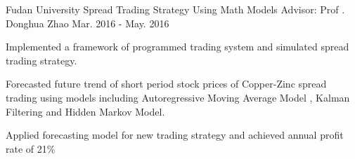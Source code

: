 \begin{cventries}
      
 \cventry
 {Fudan University} %
    {Spread Trading Strategy Using Math Models} %
{Advisor: Prof . Donghua Zhao} %
    {Mar. 2016 - May. 2016} %
    {
      \begin{cvitems} %
	\item {Implemented a framework of programmed trading system and simulated spread trading strategy.}
	\item {Forecasted future trend of short period stock prices of Copper-Zinc spread trading using models including Autoregressive Moving Average Model , Kalman Filtering and Hidden Markov Model.}
	\item {Applied forecasting model for new trading strategy and achieved annual profit rate of 21\%}
      \end{cvitems}
     }
    
\end{cventries}
